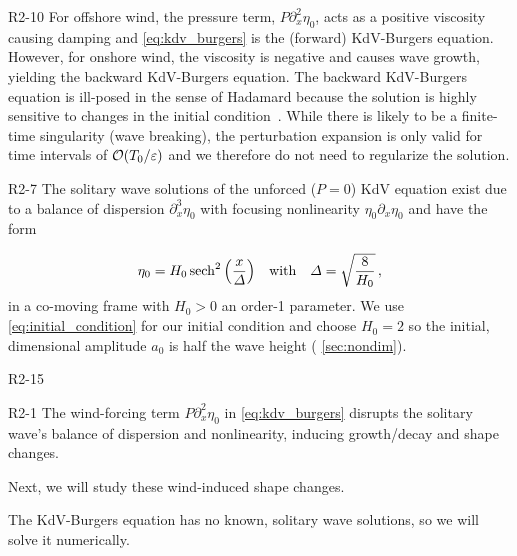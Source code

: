 \documentclass{jfm}
\renewcommand*{\epsilon}{\varepsilon}
\begin{document}
\begin{LineLabel}{R2-10}
For offshore wind, the pressure term, $P \partial^2_x \eta_0$, acts as a
positive viscosity causing damping and \cref{eq:kdv_burgers} is the
(forward) KdV-Burgers equation.
However, for onshore wind, the viscosity is negative and causes wave
growth, yielding the backward KdV-Burgers equation.
The backward KdV-Burgers equation is ill-posed in the sense of Hadamard
because the solution is highly sensitive to changes in the initial
condition~\citep{hadamard1902problemes}.
While there is likely to be a finite-time singularity (\ie wave
breaking), the perturbation expansion is only valid for time intervals
of $\order{T_0/\epsilon}$ and we therefore do not need to regularize the
solution.
\end{LineLabel}

\begin{LineLabel}{R2-7}
The solitary wave solutions of the unforced ($P=0$) KdV equation exist
due to a balance of dispersion $\partial_x^3 \eta_0$ with focusing
nonlinearity $\eta_0 \partial_x \eta_0$ and have the
form~\citep[\eg][]{mei2005nonlinear}
\end{LineLabel}
\begin{equation}
  \eta_0 = H_0 \sech^2\pqty{\frac{x}{\Delta}}
  \qq{with}
  \Delta = \sqrt{\frac{8}{H_0}} \,,
  \label{eq:initial_condition}
\end{equation}
in a co-moving frame with $H_0>0$ an order-1 parameter.
We use \cref{eq:initial_condition} for our initial condition and choose
$H_0 = 2$ so the initial, dimensional amplitude $a_0$ is half the wave
height (\cf{} \cref{sec:nondim}).
\begin{LineLabel}{R2-15}
\begin{LineLabel}{R2-1}
The wind-forcing term $P \partial_x^2 \eta_0$ in \cref{eq:kdv_burgers}
disrupts the solitary wave's balance of dispersion and nonlinearity,
inducing growth/decay and shape changes.
\end{LineLabel}
Next, we will study these wind-induced shape changes.
\end{LineLabel}
The KdV-Burgers equation has no known, solitary wave solutions, so we
will solve it numerically.
\end{document}

